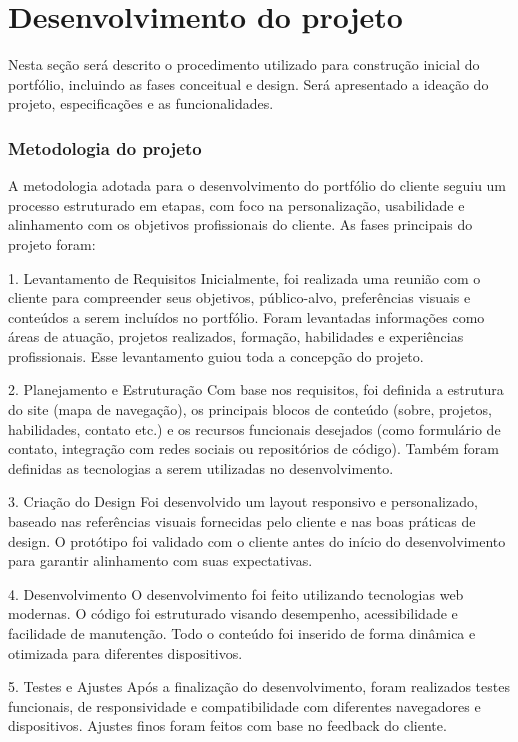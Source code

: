 \chapter{Desenvolvimento do projeto}
\label{chap:metod}
Nesta seção será descrito o procedimento utilizado para construção inicial do portfólio, incluindo as fases conceitual e design.  Será apresentado a ideação do projeto, especificações e as funcionalidades.

\subsection{Metodologia do projeto}
A metodologia adotada para o desenvolvimento do portfólio do cliente seguiu um processo estruturado em etapas, com foco na personalização, usabilidade e alinhamento com os objetivos profissionais do cliente. As fases principais do projeto foram:

1. Levantamento de Requisitos
Inicialmente, foi realizada uma reunião com o cliente para compreender seus objetivos, público-alvo, preferências visuais e conteúdos a serem incluídos no portfólio. Foram levantadas informações como áreas de atuação, projetos realizados, formação, habilidades e experiências profissionais. Esse levantamento guiou toda a concepção do projeto.

2. Planejamento e Estruturação
Com base nos requisitos, foi definida a estrutura do site (mapa de navegação), os principais blocos de conteúdo (sobre, projetos, habilidades, contato etc.) e os recursos funcionais desejados (como formulário de contato, integração com redes sociais ou repositórios de código). Também foram definidas as tecnologias a serem utilizadas no desenvolvimento.

3. Criação do Design
Foi desenvolvido um layout responsivo e personalizado, baseado nas referências visuais fornecidas pelo cliente e nas boas práticas de design. O protótipo foi validado com o cliente antes do início do desenvolvimento para garantir alinhamento com suas expectativas.

4. Desenvolvimento
O desenvolvimento foi feito utilizando tecnologias web modernas. O código foi estruturado visando desempenho, acessibilidade e facilidade de manutenção. Todo o conteúdo foi inserido de forma dinâmica e otimizada para diferentes dispositivos.

5. Testes e Ajustes
Após a finalização do desenvolvimento, foram realizados testes funcionais, de responsividade e compatibilidade com diferentes navegadores e dispositivos. Ajustes finos foram feitos com base no feedback do cliente.
